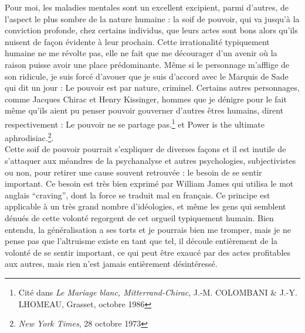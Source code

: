 \documentclass[12pt,a4paper]{article}
\begin{document}
{Pour moi, les maladies mentales sont un excellent \og{}excipient\fg{}, parmi d'autres, de l'aspect le plus sombre de la nature humaine : la soif de pouvoir, qui va jusqu'à la conviction profonde, chez certains individus, que leurs actes sont bons alors qu'ils nuisent de façon évidente à leur prochain. Cette irrationalité typiquement humaine ne me révolte pas, elle ne fait que me décourager d'un avenir où la raison puisse avoir une place prédominante. Même si le personnage m'afflige de son ridicule, je suis forcé d'avouer que je suis d'accord avec le Marquis de Sade qui dit un jour : \og{}Le pouvoir est par nature, criminel\fg{}. Certains autres personnages, comme Jacques Chirac et Henry Kissinger, hommes que je dénigre pour le fait même qu'ils aient pu penser pouvoir gouverner d'autres êtres humains, dirent respectivement : \og{}Le pouvoir ne se partage pas.\footnote{Cité dans \emph{Le Mariage blanc, Mitterrand-Chirac}, J.-M. COLOMBANI \& J.-Y. LHOMEAU, Grasset, octobre 1986}\fg{} et \og{}Power is the ultimate aphrodisiac.\footnote{\emph{New York Times}, 28 octobre 1973}\fg{}.  \\

Cette soif de pouvoir pourrait s’expliquer de diverses façons et il est inutile de s’attaquer aux méandres de la psychanalyse et autres psychologies, subjectivistes ou non, pour retirer une cause souvent retrouvée : le besoin de se sentir important. Ce besoin est très bien exprimé par William James qui utilisa le mot anglais “craving”, dont la force se traduit mal en français. Ce principe est applicable à un très grand nombre d’idéologies, et même les gens qui semblent dénués de cette volonté regorgent de cet orgueil typiquement humain. Bien entendu, la généralisation a ses torts et je pourrais bien me tromper, mais je ne pense pas que l’altruisme existe en tant que tel, il découle entièrement de la volonté de se sentir important, ce qui peut être exaucé par des actes profitables aux autres, mais rien n’est jamais entièrement désintéressé. \\

}
\end{document}
